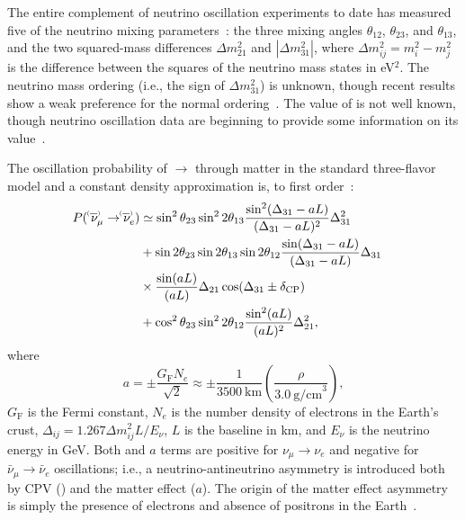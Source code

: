 The entire complement of neutrino oscillation experiments to date has measured five of the neutrino mixing parameters~\cite{Esteban:2018azc,deSalas:2017kay,Capozzi:2017yic}: the three mixing angles $\theta_{12}$, $\theta_{23}$, and $\theta_{13}$, and the two squared-mass differences $\Delta m^{2}_{21}$ and $|\Delta m^{2}_{31}|$, where $\Delta m^2_{ij} = m^2_{i} - m^{2}_{j}$ is the difference between the squares of the neutrino mass states in eV$^{2}$.
The neutrino mass ordering (i.e., the sign of $\Delta m^{2}_{31}$) is unknown, though recent results show a weak preference for the normal ordering~\cite{Abe:2018wpn,PhysRevD.97.072001,PhysRevLett.123.151803}.
The value of \deltacp is not well known, though neutrino oscillation data are beginning to provide some information on its value~\cite{Abe:2018wpn,Abe:2019vii}.

The oscillation probability of \numu $\rightarrow$ \nue through matter in the standard three-flavor model and a constant density approximation is, to first order~\cite{Nunokawa:2007qh}:
\begin{equation}
  \begin{aligned}
    P(\;\nu^{\bracketbar}_\mu \rightarrow \nu^{\bracketbar}_e) & \simeq \sin^2 \theta_{23} \sin^2 2 \theta_{13} 
    \frac{ \sin^2(\Delta_{31} - aL)}{(\Delta_{31}-aL)^2} \Delta_{31}^2 \\
    & + \sin 2 \theta_{23} \sin 2 \theta_{13} \sin 2 \theta_{12}\frac{ \sin(\Delta_{31} - aL)}{(\Delta_{31}-aL)} \Delta_{31} \\
    &\times \frac{\sin(aL)}{(aL)} \Delta_{21} \cos (\Delta_{31} \pm \deltacp) & \\
    & + \cos^2 \theta_{23} \sin^2 2 \theta_{12} \frac {\sin^2(aL)}{(aL)^2} \Delta_{21}^2,
  \end{aligned}
  \label{eqn:appprob}
\end{equation}
where
\begin{equation*}
  a = \pm \frac{G_{\mathrm{F}}N_e}{\sqrt{2}} \approx \pm\frac{1}{3500~\mathrm{km}}\left(\frac{\rho}{3.0~\mathrm{g/cm}^{3}}\right),
\end{equation*}
$G_{\mathrm{F}}$ is the Fermi constant, $N_e$ is the number density of electrons in the Earth's crust, $\Delta_{ij} = 1.267 \Delta m^2_{ij} L/E_\nu$, $L$ is the baseline in km, and $E_\nu$ is the neutrino energy in GeV. 
Both \deltacp and $a$ terms are positive for $\nu_\mu \to \nu_e$ and negative for $\bar{\nu}_\mu \to \bar{\nu}_e$ oscillations; i.e.,
a neutrino-antineutrino asymmetry is introduced both by CPV (\deltacp) and the matter effect ($a$). The origin of the matter effect asymmetry 
is simply the presence of electrons and absence of positrons in the Earth~\cite{Wolfenstein:1977ue,Mikheev:1986gs}.


